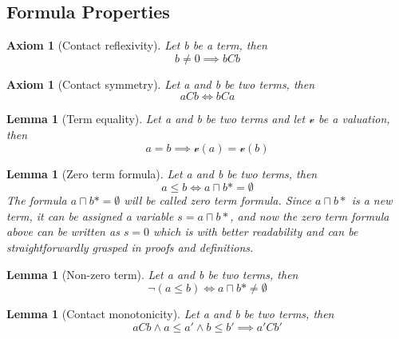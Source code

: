 \documentclass{article}
\newtheorem{lemma}[theorem]{Lemma}
\newtheorem{axiom}[theorem]{Axiom}
\begin{document}
	\subsection{Formula Properties}
\begin{axiom}[Contact reflexivity]
	Let b be a term, then
	\begin{equation*}
		b \neq 0 \implies bCb
	\end{equation*}
\end{axiom}

\begin{axiom}[Contact symmetry]
	Let a and b be two terms, then
	\begin{equation*}
		aCb \iff bCa
	\end{equation*}
\end{axiom}

\begin{lemma}[Term equality]
	Let a and b be two terms and let $\mathscr{v}$ be a valuation, then
	\begin{equation*}
		a = b \implies \mathscr{v}(a) = \mathscr{v}(b)
	\end{equation*}
\end{lemma}

\begin{lemma}[Zero term formula]
	Let a and b be two terms, then
	\begin{equation*}
		a \le b \iff a \sqcap b* = \emptyset
	\end{equation*}
	The formula $a \sqcap b* = \emptyset$ will be called zero term formula.
	Since $a \sqcap b*$ is a new term, it can be assigned a variable $s = a \sqcap b*$, 
	and now the zero term formula above can be written as $s  = 0$ which is with better readability and 
	can be straightforwardly grasped in proofs and definitions.
\end{lemma}

\begin{lemma}[Non-zero term]
	Let a and b be two terms, then
	\begin{equation*}
		\neg(a \le b) \iff a \sqcap b* \neq \emptyset
	\end{equation*}
\end{lemma}

\begin{lemma}[Contact monotonicity]
	Let a and b be two terms, then
	\begin{equation*}
		aCb \land a \leq a' \land b \le b' \implies a'Cb'
	\end{equation*}
\end{lemma}
\end{document}
